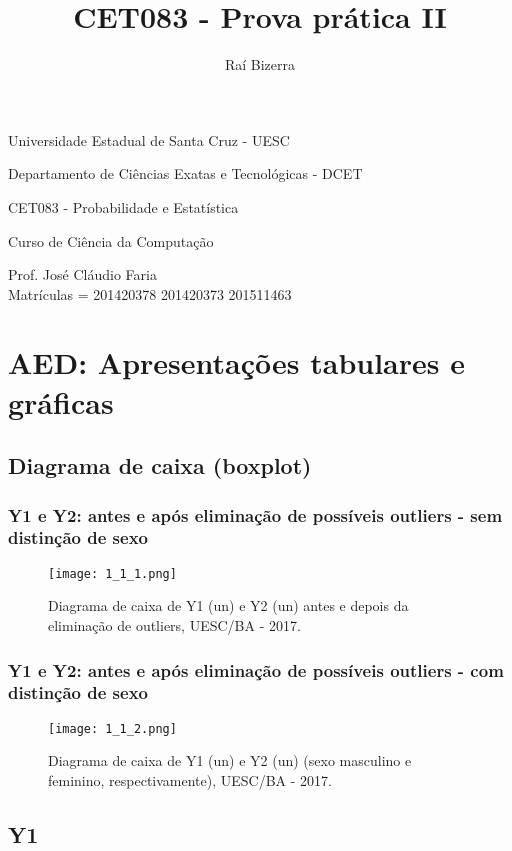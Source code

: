 \documentclass[a4paper, 10pt]{article}
\title{CET083 - Prova prática II}
\author{Raí Bizerra}
\date{}
\begin{document}
	Universidade Estadual de Santa Cruz - UESC
	
	Departamento de Ciências Exatas e Tecnológicas - DCET
	
	CET083 - Probabilidade e Estatística
	
	Curso de Ciência da Computação
	
	Prof. José Cláudio Faria\\
	
	Matrículas = 201420378 201420373 201511463 \newpage	
	
	\section{AED: Apresentações tabulares e gráficas}
		\subsection{Diagrama de caixa (boxplot)}
			\subsubsection{Y1 e Y2: antes e após eliminação de possíveis outliers - sem distinção de sexo}
			\begin{figure}[!htb]
				\texttt{[image: 1\_1\_1.png]}
				\caption{Diagrama de caixa de Y1 (un) e Y2 (un) antes e depois da eliminação de outliers, UESC/BA - 2017.}
			\end{figure}
		\subsubsection{Y1 e Y2: antes e após eliminação de possíveis outliers - com distinção de sexo}		
			\begin{figure}[!htb]
				\texttt{[image: 1\_1\_2.png]}
				\caption{Diagrama de caixa de Y1 (un) e Y2 (un) (sexo masculino e feminino, respectivamente), UESC/BA - 2017.}
			\end{figure} \newpage
		\subsection{Y1}
\end{document}
